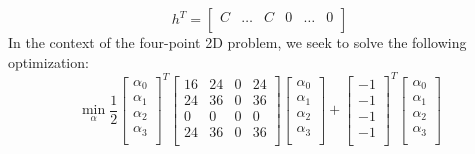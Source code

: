 \documentclass{article}
\begin{document}
$$
h^T=
\begin{bmatrix}
  C & \dots & C & 0 & \dots & 0 \\
\end{bmatrix}
$$
In the context of the four-point 2D problem, we seek to solve the following optimization:
$$\min_\alpha \frac{1}{2}
\begin{bmatrix}
  \alpha_0 \\
  \alpha_1 \\
  \alpha_2 \\
  \alpha_3 \\
\end{bmatrix}^T
\begin{bmatrix}
  16 & 24 & 0 & 24 \\
  24 & 36 & 0 & 36 \\
  0  & 0  & 0 & 0 \\
  24 & 36 & 0 & 36 \\
\end{bmatrix}
\begin{bmatrix}
  \alpha_0 \\
  \alpha_1 \\
  \alpha_2 \\
  \alpha_3 \\
\end{bmatrix}
+
\begin{bmatrix}
  -1 \\
  -1 \\
  -1 \\
  -1 \\
\end{bmatrix}^T
\begin{bmatrix}
  \alpha_0 \\
  \alpha_1 \\
  \alpha_2 \\
  \alpha_3 \\
\end{bmatrix}
$$
\end{document}
